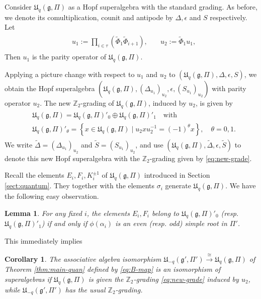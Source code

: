 \documentclass[12pt]{amsart}
\newtheorem{lemma}[theorem]{Lemma}
\newtheorem{corollary}[theorem]{Corollary}
\theoremstyle{definition}
\theoremstyle{remark}
\numberwithin{equation}{section}
\begin{document}
Consider ${{\mathfrak U}}_q({{\mathfrak g}}, \Pi)$ as a Hopf superalgebra with the standard grading. As before, we denote its comultiplication, counit and antipode by $\Delta, \epsilon$ and $S$ respectively. Let
\begin{eqnarray}\label{eq:u1u2}
\begin{aligned}
&u_1:=\prod_{i\in\tau}(\tilde{\Phi}_1\tilde{\Phi}_{i+1}), \quad &u_2:=\tilde{\Phi}_1 u_1,
\end{aligned}
\end{eqnarray}
Then $u_1$ is the parity operator of ${{\mathfrak U}}_q({{\mathfrak g}}, \Pi)$.

Applying a picture change with respect to $u_1$ and $u_2$ to $({{\mathfrak U}}_q({{\mathfrak g}}, \Pi), \Delta, \epsilon, S)$, we obtain the
Hopf superalgebra $({{\mathfrak U}}_q({{\mathfrak g}}, \Pi), (\Delta_{u_1})_{u_2}, \epsilon, (S_{u_1})_{u_2})$
with parity operator $u_2$.
The new ${{\mathbb Z}}_2$-grading of ${{\mathfrak U}}_q({{\mathfrak g}}, \Pi)$, induced by $u_2$,  is given by
\begin{eqnarray}\label{eq:new-grade}
\begin{aligned}
&{{\mathfrak U}}_q({{\mathfrak g}}, \Pi)={{\mathfrak U}}_q({{\mathfrak g}}, \Pi)'_0\oplus{{\mathfrak U}}_q({{\mathfrak g}}, \Pi)'_1  \quad \text{with}\\
&{{\mathfrak U}}_q({{\mathfrak g}}, \Pi)'_\theta=\left\{x\in {{\mathfrak U}}_q({{\mathfrak g}}, \Pi)\mid u_2 x u_2^{-1} = (-1)^\theta x\right\},
\quad \theta=0, 1.
\end{aligned}
\end{eqnarray}
We write $\tilde{\Delta}=(\Delta_{u_1})_{u_2}$ and $\tilde{S}=(S_{u_1})_{u_2}$, and use
$({{\mathfrak U}}_q({{\mathfrak g}}, \Pi), \tilde{\Delta}, \epsilon, \tilde{S})$ to denote
this new Hopf superalgebra with the ${{\mathbb Z}}_2$-grading given by \eqref{eq:new-grade}.

Recall the elements $E_i, F_i, K_i^{\pm 1}$ of ${{\mathfrak U}}_q({{\mathfrak g}}, \Pi)$ introduced in Section \ref{sect:quantum}. 
They together with the elements $\sigma_i$ generate ${{\mathfrak U}}_q({{\mathfrak g}}, \Pi)$. We have the following easy observation.
\begin{lemma} For any fixed $i$, the elements $E_i, F_i$ belong to ${{\mathfrak U}}_q({{\mathfrak g}}, \Pi)'_0$
(resp. ${{\mathfrak U}}_q({{\mathfrak g}}, \Pi)'_1$) if and only if $\phi(\alpha_i)$ is an even (resp. odd) simple root in $\Pi'$.
\end{lemma}
This immediately implies
\begin{corollary} \label{cor:alg-iso} The associative algebra isomorphism ${{\mathfrak U}}_{-q}({{\mathfrak g}}', \Pi')\stackrel{\cong}{\longrightarrow} {{\mathfrak U}}_q({{\mathfrak g}}, \Pi)$ of Theorem \ref{thm:main-quan} defined by \eqref{eq:B-map}
is an isomorphism of superalgebras if
${{\mathfrak U}}_q({{\mathfrak g}}, \Pi)$ is given the ${{\mathbb Z}}_2$-grading \eqref{eq:new-grade} induced by $u_2$, while ${{\mathfrak U}}_{-q}({{\mathfrak g}}', \Pi')$ has  the usual ${{\mathbb Z}}_2$-grading.
\end{corollary}
\end{document}
